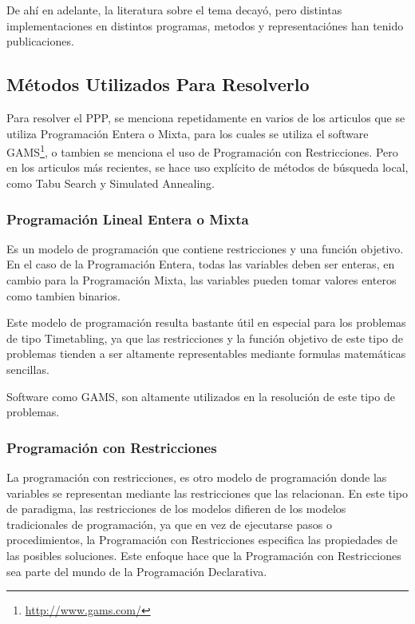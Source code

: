 \documentclass[letter, 10pt]{article}
\begin{document}
De ahí en adelante, la literatura sobre el tema decayó, pero distintas implementaciones en distintos programas, metodos y representaciónes han tenido publicaciones. \cite{CustomizingSearch,ProgressOnThePartyProblem}

\subsection{Métodos Utilizados Para Resolverlo}
Para resolver el PPP, se menciona repetidamente en varios de los articulos que se utiliza Programación Entera o Mixta, para los cuales se utiliza el software GAMS\footnote{\url{http://www.gams.com/}}, o tambien se menciona el uso de Programación con Restricciones\cite{FirstPublication}. Pero en los articulos más recientes, se hace uso explícito de métodos de búsqueda local, como Tabu Search y Simulated Annealing.

\subsubsection{Programación Lineal Entera o Mixta}
Es un modelo de programación que contiene restricciones y una función objetivo. En el caso de la Programación Entera, todas las variables deben ser enteras, en cambio para la Programación Mixta, las variables pueden tomar valores enteros como tambien binarios.

Este modelo de programación resulta bastante útil en especial para los problemas de tipo Timetabling, ya que las restricciones y la función objetivo de este tipo de problemas tienden a ser altamente representables mediante formulas matemáticas sencillas.

Software como GAMS, son altamente utilizados en la resolución de este tipo de problemas.

\subsubsection{Programación con Restricciones}
La programación con restricciones, es otro modelo de programación donde las variables se representan mediante las restricciones que las relacionan. En este tipo de paradigma, las restricciones de los modelos difieren de los modelos tradicionales de programación, ya que en vez de ejecutarse pasos o procedimientos, la Programación con Restricciones especifica las propiedades de las posibles soluciones. Este enfoque hace que la Programación con Restricciones sea parte del mundo de la Programación Declarativa.
\end{document}
